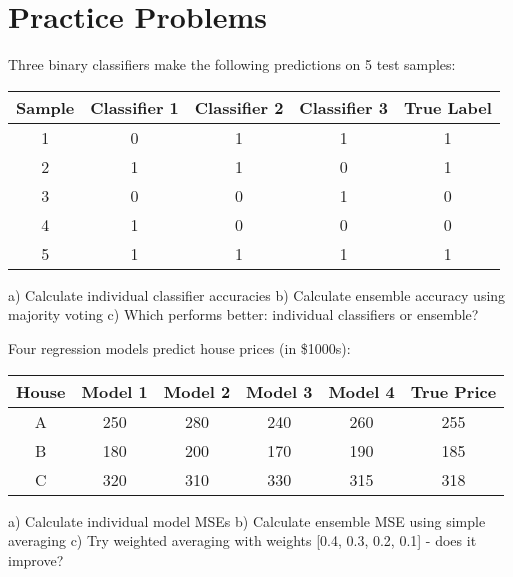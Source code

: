 \documentclass{article}
\newcounter{exercise}
\begin{document}
\section{Practice Problems}

\begin{tcolorbox}[colback=gray!5!white,colframe=gray!75!black,title=Problem \stepcounter{exercise}: Basic Ensemble Voting]

Three binary classifiers make the following predictions on 5 test samples:
\begin{center}
\begin{tabular}{|c|c|c|c|c|}
\hline
Sample & Classifier 1 & Classifier 2 & Classifier 3 & True Label \\
\hline
1 & 0 & 1 & 1 & 1 \\
2 & 1 & 1 & 0 & 1 \\
3 & 0 & 0 & 1 & 0 \\
4 & 1 & 0 & 0 & 0 \\
5 & 1 & 1 & 1 & 1 \\
\hline
\end{tabular}
\end{center}

a) Calculate individual classifier accuracies
b) Calculate ensemble accuracy using majority voting
c) Which performs better: individual classifiers or ensemble?
\end{tcolorbox}

\begin{tcolorbox}[colback=gray!5!white,colframe=gray!75!black,title=Problem \stepcounter{exercise}: Regression Ensemble]

Four regression models predict house prices (in \$1000s):
\begin{center}
\begin{tabular}{|c|c|c|c|c|c|}
\hline
House & Model 1 & Model 2 & Model 3 & Model 4 & True Price \\
\hline
A & 250 & 280 & 240 & 260 & 255 \\
B & 180 & 200 & 170 & 190 & 185 \\
C & 320 & 310 & 330 & 315 & 318 \\
\hline
\end{tabular}
\end{center}

a) Calculate individual model MSEs
b) Calculate ensemble MSE using simple averaging
c) Try weighted averaging with weights [0.4, 0.3, 0.2, 0.1] - does it improve?
\end{tcolorbox}
\end{document}
